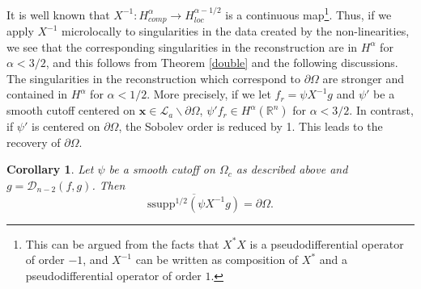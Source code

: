 \documentclass[a4paper,12pt]{amsart}
\numberwithin{equation}{section}
\theoremstyle{plain}
\numberwithin{theorem}{section}
\newtheorem{corollary}[theorem]{Corollary}
\theoremstyle{definition}
\theoremstyle{remark}
\theoremstyle{remark}
\theoremstyle{remark}
\newcommand{\s}{\mathcal S}
\newcommand{\vv}{{\mathbf{v}}}
\newcommand{\vx}{{\mathbf{x}}}
\newcommand{\ssupp}{\text{ssupp}}
\begin{document}
{It is well known that $X^{-1} : H_{comp}^{\alpha} \to H^{\alpha - 1/2}_{loc}$ is a continuous map\footnote{This can be argued from the facts that $X^* X$ is a pseudodifferential operator of order $-1$, and $X^{-1}$ can be written as composition of $X^*$ and a pseudodifferential operator of order $1$.}. Thus, if we apply $X^{-1}$ microlocally to singularities in the data created by the non-linearities, we see that the corresponding singularities in the reconstruction are in $H^{\alpha}$ for $\alpha < 3/2$, and this follows from Theorem \ref{double} and the following discussions. The singularities in the reconstruction which correspond to $\partial \Omega$ are stronger and contained in $H^{\alpha}$ for $\alpha < 1/2$. More precisely, if we let $f_r = \psi X^{-1}g$ and $\psi'$ be a smooth cutoff centered on $\vx \in \mathcal{L}_a\backslash \partial \Omega$, $\psi' f_r \in H^{\alpha}(\mathbb{R}^n)$ for $\alpha < 3/2$. In contrast, if $\psi'$ is centered on $\partial \Omega$, the Sobolev order is reduced by 1. This leads to the recovery of $\partial \Omega$.
\begin{corollary}\label{corr_bound}
Let $\psi$ be a smooth cutoff on $\Omega_c$ as described above and $g = \mathcal{D}_{n-2}(f,g)$. Then 
\begin{equation}
\overline{\ssupp^{1/2}(\psi X^{-1}g)} = \partial \Omega.
\end{equation}
\end{corollary}



}
\end{document}
